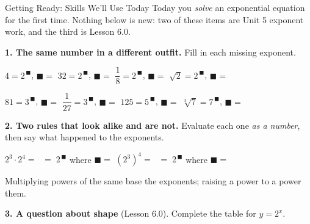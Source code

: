 \documentclass[10pt]{article}
\begin{document}
\namedateperiod

\vspace{0.10in}

\begin{notesbox}{Getting Ready: Skills We'll Use Today}
\small Today you \emph{solve} an exponential equation for the first time. Nothing below is new: two of
these items are Unit 5 exponent work, and the third is Lesson 6.0.

\vspace{5pt}
\textbf{1. The same number in a different outfit.} Fill in each missing exponent.

\vspace{4pt}
\hspace*{1.2em} $4 = 2^{\,\blacksquare}$, \; $\blacksquare=$  \qquad
$32 = 2^{\,\blacksquare}$, \; $\blacksquare=$  \qquad
$\dfrac{1}{8} = 2^{\,\blacksquare}$, \; $\blacksquare=$  \qquad
$\sqrt{2} = 2^{\,\blacksquare}$, \; $\blacksquare=$ 

\vspace{5pt}
\hspace*{1.2em} $81 = 3^{\,\blacksquare}$, \; $\blacksquare=$  \qquad
$\dfrac{1}{27} = 3^{\,\blacksquare}$, \; $\blacksquare=$  \qquad
$125 = 5^{\,\blacksquare}$, \; $\blacksquare=$  \qquad
$\sqrt[3]{7} = 7^{\,\blacksquare}$, \; $\blacksquare=$ 

\vspace{0.32in}

\textbf{2. Two rules that look alike and are not.} Evaluate each one \emph{as a number}, then say what
happened to the exponents.

\vspace{4pt}
\hspace*{1.2em} $2^{3}\cdot 2^{4} =$  $\;=\; 2^{\,\blacksquare}$ where $\blacksquare=$
 \qquad
$\left(2^{3}\right)^{4} =$  $\;=\; 2^{\,\blacksquare}$ where $\blacksquare=$

\vspace{4pt}
\hspace*{1.2em} Multiplying powers of the same base  the exponents; raising a power to a
power  them.

\vspace{0.38in}

\textbf{3. A question about shape} (Lesson 6.0). Complete the table for $y=2^{x}$.


\end{notesbox}
\end{document}
